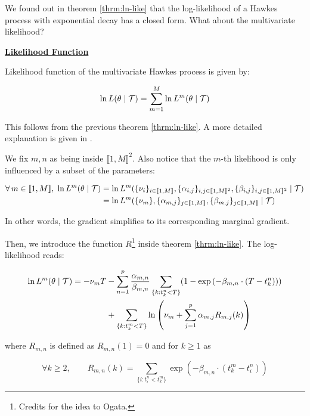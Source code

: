 We found out in theorem \ref{thrm:ln-like} that the log-likelihood of a Hawkes process with exponential decay has a closed form. What about the multivariate likelihood?

\vspace{0.6 cm}
\underline{\textbf{Likelihood Function}}

Likelihood function of the multivariate Hawkes process is given by:

\begin{equation}
\ln L( \theta \mid \mathcal{T} ) = \sum_{m = 1}^M \ln L^m( \theta \mid \mathcal{T} )
\label{eq:ln_multi}
\end{equation}

This follows from the previous theorem \ref{thrm:ln-like}. A more detailed explanation is given in \cite{Likelihood_Hawkes}.



We fix $m,n$ as being inside $\llbracket 1, M \rrbracket ^2 $. Also notice that the $m$-th likelihood is only influenced by a subset of the parameters:

\begin{align*}
\forall m \in \llbracket 1, M \rrbracket , \  \ln L^m( \theta \mid \Tau ) &= \ln L^m( 
\{ \nu_i \}_{ i \in  \llbracket 1, M \rrbracket  },
\{ \alpha_{i,j} \} _{ i,j \in  \llbracket 1, M \rrbracket ^2 },
\{ \beta_{i,j} \}_{ i,j \in  \llbracket 1, M \rrbracket ^2 }
\mid \Tau ) \\
&= \ln L^m( 
\{ \nu_m \},
\{ \alpha_{m,j} \} _{ j \in  \llbracket 1, M \rrbracket  },
\{ \beta_{m,j} \}_{j \in  \llbracket 1, M \rrbracket  }
\mid \Tau )
\end{align*}

In other words, the gradient simplifies to its corresponding marginal gradient. 

Then, we introduce the function $R$\footnote{Credits for the idea to Ogata.} inside theorem \ref{thrm:ln-like}. The log-likelihood reads:


\begin{align}
\ln L^m( \theta \mid \mathcal{T} ) = - \nu_m T &- \sum^p_{n=1} \frac {\alpha_{m,n} } {\beta_{m,n}}  \sum_{ \{k : t_k^n < T \} } (1 - \exp \left ( - \beta_{m,n} \cdot ( T - t_k^n ) \right )) \notag \\ 
&+ \sum_{ \{k : t_k^m < T \} } \ln \left ( \nu_m + \sum_{j=1}^p \alpha_{m,j} R_{m,j} (k) \right ) 
\end{align}

where $R_{m,n}$ is defined as $R_{m,n}(1) = 0 $ and for $k \geq 1$ as  

\begin{equation*}
\forall k \geq 2, \qquad R_{m,n} (k) = \sum_{ \{i : t_i^n < t_k^m \} } \exp \left ( - \beta_{m,n} \cdot ( t_k^m - t_i^n )  \right ) 
\end{equation*}

